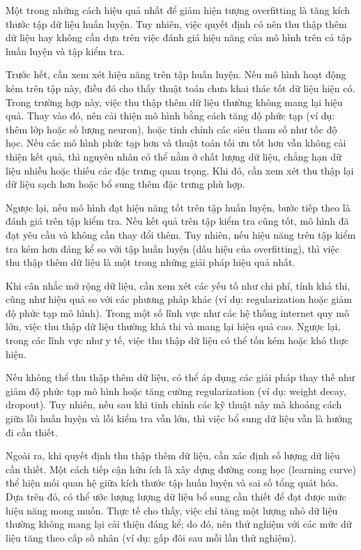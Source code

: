 Một trong những cách hiệu quả nhất để giảm hiện tượng overfitting là tăng kích thước tập dữ liệu huấn luyện. Tuy nhiên, việc quyết định có nên thu thập thêm dữ liệu hay không cần dựa trên việc đánh giá hiệu năng của mô hình trên cả tập huấn luyện và tập kiểm tra.

Trước hết, cần xem xét hiệu năng trên tập huấn luyện. Nếu mô hình hoạt động kém trên tập này, điều đó cho thấy thuật toán chưa khai thác tốt dữ liệu hiện có. Trong trường hợp này, việc thu thập thêm dữ liệu thường không mang lại hiệu quả. Thay vào đó, nên cải thiện mô hình bằng cách tăng độ phức tạp (ví dụ: thêm lớp hoặc số lượng neuron), hoặc tinh chỉnh các siêu tham số như tốc độ học. Nếu các mô hình phức tạp hơn và thuật toán tối ưu tốt hơn vẫn không cải thiện kết quả, thì nguyên nhân có thể nằm ở chất lượng dữ liệu, chẳng hạn dữ liệu nhiễu hoặc thiếu các đặc trưng quan trọng. Khi đó, cần xem xét thu thập lại dữ liệu sạch hơn hoặc bổ sung thêm đặc trưng phù hợp.

Ngược lại, nếu mô hình đạt hiệu năng tốt trên tập huấn luyện, bước tiếp theo là đánh giá trên tập kiểm tra. Nếu kết quả trên tập kiểm tra cũng tốt, mô hình đã đạt yêu cầu và không cần thay đổi thêm. Tuy nhiên, nếu hiệu năng trên tập kiểm tra kém hơn đáng kể so với tập huấn luyện (dấu hiệu của overfitting), thì việc thu thập thêm dữ liệu là một trong những giải pháp hiệu quả nhất.

Khi cân nhắc mở rộng dữ liệu, cần xem xét các yếu tố như chi phí, tính khả thi, cũng như hiệu quả so với các phương pháp khác (ví dụ: regularization hoặc giảm độ phức tạp mô hình). Trong một số lĩnh vực như các hệ thống internet quy mô lớn, việc thu thập dữ liệu thường khả thi và mang lại hiệu quả cao. Ngược lại, trong các lĩnh vực như y tế, việc thu thập dữ liệu có thể tốn kém hoặc khó thực hiện.

Nếu không thể thu thập thêm dữ liệu, có thể áp dụng các giải pháp thay thế như giảm độ phức tạp mô hình hoặc tăng cường regularization (ví dụ: weight decay, dropout). Tuy nhiên, nếu sau khi tinh chỉnh các kỹ thuật này mà khoảng cách giữa lỗi huấn luyện và lỗi kiểm tra vẫn lớn, thì việc bổ sung dữ liệu vẫn là hướng đi cần thiết.

Ngoài ra, khi quyết định thu thập thêm dữ liệu, cần xác định số lượng dữ liệu cần thiết. Một cách tiếp cận hữu ích là xây dựng đường cong học (learning curve) thể hiện mối quan hệ giữa kích thước tập huấn luyện và sai số tổng quát hóa. Dựa trên đó, có thể ước lượng lượng dữ liệu bổ sung cần thiết để đạt được mức hiệu năng mong muốn. Thực tế cho thấy, việc chỉ tăng một lượng nhỏ dữ liệu thường không mang lại cải thiện đáng kể; do đó, nên thử nghiệm với các mức dữ liệu tăng theo cấp số nhân (ví dụ: gấp đôi sau mỗi lần thử nghiệm).

